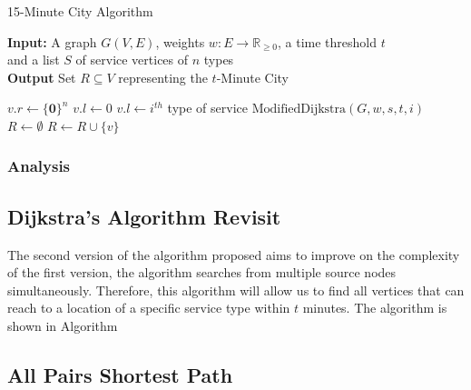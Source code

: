 \begin{algorithm}[H]
    \caption{15-Minute City Algorithm}\label{alg:15mc}
    \textbf{Input:} A graph $G(V,E)$, weights $w:E\rightarrow\mathbb{R}_{\geq 0}$, a time threshold $t$ \\  and a list $S$ of service vertices of $n$ types\\
    \textbf{Output} Set $R\subseteq V$ representing the $t$-Minute City
    \begin{algorithmic}
            \State $v.r \gets \{\mathbf{0}\}^{n}$
            \State $v.l \gets 0$
        \EndFor
            \State $v.l \gets i^{th}$ type of service
        \EndFor
                \State $\text{ModifiedDijkstra}(G,w,s,t,i)$
            \EndFor
        \EndFor
        \State $R\gets\emptyset$
                \State $R \gets R\cup \{v\}$
            \EndIf
        \EndFor
    \end{algorithmic}
\end{algorithm}

\subsubsection{Analysis}

\subsection{Dijkstra's Algorithm Revisit}

The second version of the algorithm proposed aims to improve on the complexity of the first version, the algorithm searches from multiple source nodes simultaneously. Therefore, this algorithm will allow us to find all vertices that can reach to a location of a specific service type within $t$ minutes. The algorithm is shown in Algorithm %

\subsection{All Pairs Shortest Path}